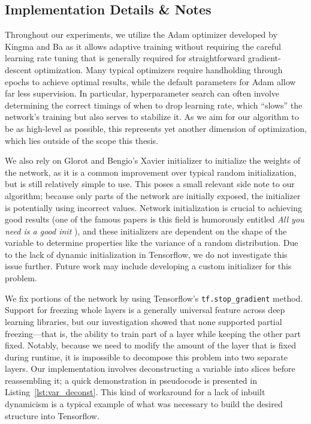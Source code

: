 \subsection{Implementation Details \& Notes}
Throughout our experiments, we utilize the Adam optimizer developed by Kingma and Ba \cite{kingma2014adam} as it allows adaptive training without requiring the careful learning rate tuning that is generally required for straightforward gradient-descent optimization.
Many typical optimizers require handholding through epochs to achieve optimal results, while the default parameters for Adam allow far less supervision.
In particular, hyperparameter search can often involve determining the correct timings of when to drop learning rate, which ``slows'' the network's training but also serves to stabilize it.
As we aim for our algorithm to be as high-level as possible, this represents yet another dimension of optimization, which lies outside of the scope this thesis.

We also rely on Glorot and Bengio's Xavier initializer \cite{glorot2010understanding} to initialize the weights of the network, as it is a common improvement over typical random initialization, but is still relatively simple to use.
This poses a small relevant side note to our algorithm; because only parts of the network are initially exposed, the initializer is potentially using incorrect values.
Network initialization is crucial to achieving good results (one of the famous papers is this field is humorously entitled \emph{All you need is a good init} \cite{mishkin2015all}), and these initializers are dependent on the shape of the variable to determine properties like the variance of a random distribution.
Due to the lack of dynamic initialization in Tensorflow, we do not investigate this issue further.
Future work may include developing a custom initializer for this problem.

We fix portions of the network by using Tensorflow's \texttt{tf.stop\_gradient} method.
Support for freezing whole layers is a generally universal feature across deep learning libraries, but our investigation showed that none supported partial freezing---that is, the ability to train part of a layer while keeping the other part fixed.
Notably, because we need to modify the amount of the layer that is fixed during runtime, it is impossible to decompose this problem into two separate layers.
Our implementation involves deconstructing a variable into slices before reassembling it; a quick demonstration in pseudocode is presented in Listing~\ref{lst:var_deconst}.
This kind of workaround for a lack of inbuilt dynamicism is a typical example of what was necessary to build the desired structure into Tensorflow.

